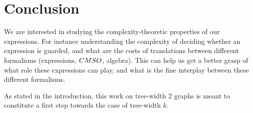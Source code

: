 \section{Conclusion}
We are interested in studying the complexity-theoretic properties of our
expressions. For instance understanding the complexity of deciding
whether an expression is guarded, and what are the costs of translations
between different formalisms (expressions, $\CMSO$, algebra). This can
help us get a better grasp of what role these expressions can play, and
what is the fine interplay between these different formalisms.

As stated in the introduction, this work on tree-width $2$ graphs is
meant to constitute a first step towards the case of
tree-width $k$.
